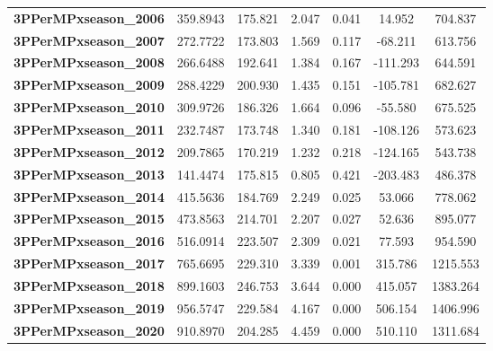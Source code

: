 \begin{center}
\begin{tabular}{lcccccc}
\textbf{3PPerMPxseason\_2006} &     359.8943  &      175.821     &     2.047  &         0.041        &       14.952    &      704.837     \\
\textbf{3PPerMPxseason\_2007} &     272.7722  &      173.803     &     1.569  &         0.117        &      -68.211    &      613.756     \\
\textbf{3PPerMPxseason\_2008} &     266.6488  &      192.641     &     1.384  &         0.167        &     -111.293    &      644.591     \\
\textbf{3PPerMPxseason\_2009} &     288.4229  &      200.930     &     1.435  &         0.151        &     -105.781    &      682.627     \\
\textbf{3PPerMPxseason\_2010} &     309.9726  &      186.326     &     1.664  &         0.096        &      -55.580    &      675.525     \\
\textbf{3PPerMPxseason\_2011} &     232.7487  &      173.748     &     1.340  &         0.181        &     -108.126    &      573.623     \\
\textbf{3PPerMPxseason\_2012} &     209.7865  &      170.219     &     1.232  &         0.218        &     -124.165    &      543.738     \\
\textbf{3PPerMPxseason\_2013} &     141.4474  &      175.815     &     0.805  &         0.421        &     -203.483    &      486.378     \\
\textbf{3PPerMPxseason\_2014} &     415.5636  &      184.769     &     2.249  &         0.025        &       53.066    &      778.062     \\
\textbf{3PPerMPxseason\_2015} &     473.8563  &      214.701     &     2.207  &         0.027        &       52.636    &      895.077     \\
\textbf{3PPerMPxseason\_2016} &     516.0914  &      223.507     &     2.309  &         0.021        &       77.593    &      954.590     \\
\textbf{3PPerMPxseason\_2017} &     765.6695  &      229.310     &     3.339  &         0.001        &      315.786    &     1215.553     \\
\textbf{3PPerMPxseason\_2018} &     899.1603  &      246.753     &     3.644  &         0.000        &      415.057    &     1383.264     \\
\textbf{3PPerMPxseason\_2019} &     956.5747  &      229.584     &     4.167  &         0.000        &      506.154    &     1406.996     \\
\textbf{3PPerMPxseason\_2020} &     910.8970  &      204.285     &     4.459  &         0.000        &      510.110    &     1311.684     \\

\end{tabular}
\end{center}
